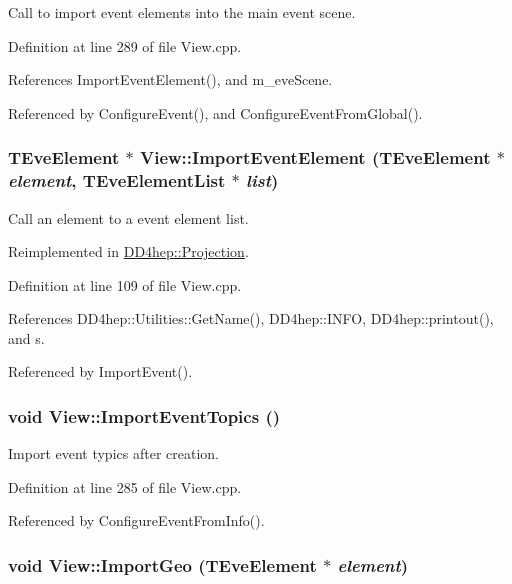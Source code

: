 Call to import event elements into the main event scene. 

Definition at line 289 of file View.cpp.

References ImportEventElement(), and m\_\-eveScene.

Referenced by ConfigureEvent(), and ConfigureEventFromGlobal().\hypertarget{class_d_d4hep_1_1_view_acd696f9f50bda0d632cec822ab1f4672}{
\subsubsection[{ImportEventElement}]{\setlength{\rightskip}{0pt plus 5cm}TEveElement $\ast$ View::ImportEventElement (TEveElement $\ast$ {\em element}, \/  {\bf TEveElementList} $\ast$ {\em list})}}
\label{class_d_d4hep_1_1_view_acd696f9f50bda0d632cec822ab1f4672}


Call an element to a event element list. 

Reimplemented in \hyperlink{class_d_d4hep_1_1_projection_a63d20236b4b67710dcfb9904848465aa}{DD4hep::Projection}.

Definition at line 109 of file View.cpp.

References DD4hep::Utilities::GetName(), DD4hep::INFO, DD4hep::printout(), and s.

Referenced by ImportEvent().\hypertarget{class_d_d4hep_1_1_view_a825772febdb79469f13b40dd0acbe03c}{
\subsubsection[{ImportEventTopics}]{\setlength{\rightskip}{0pt plus 5cm}void View::ImportEventTopics ()}}
\label{class_d_d4hep_1_1_view_a825772febdb79469f13b40dd0acbe03c}


Import event typics after creation. 

Definition at line 285 of file View.cpp.

Referenced by ConfigureEventFromInfo().\hypertarget{class_d_d4hep_1_1_view_aa316fb1bb5375d1e57ba534a510919a7}{
\subsubsection[{ImportGeo}]{\setlength{\rightskip}{0pt plus 5cm}void View::ImportGeo (TEveElement $\ast$ {\em element})}}
\label{class_d_d4hep_1_1_view_aa316fb1bb5375d1e57ba534a510919a7}


